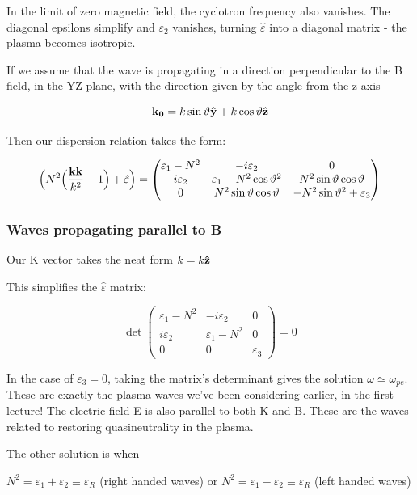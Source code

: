 \documentclass[PlasmaNotes.tex]{subfiles}
\begin{document}
In the limit of zero magnetic field, the cyclotron frequency also vanishes. The diagonal epsilons simplify and $\varepsilon_2$ vanishes, turning $\hat{\varepsilon}$ into a diagonal matrix - the plasma becomes isotropic.

If we assume that the wave is propagating in a direction perpendicular to the B field, in the YZ plane, with the direction given by the angle from the z axis

\[ \mathbf{k_0} =k \sin{\vartheta} \mathbf{\hat{y}} + k \cos{\vartheta} \mathbf{\hat{z}}  \]

Then our dispersion relation takes the form:

\[ \Big(N^2 \Big(\frac{\mathbf{k}\mathbf{k}}{k^2} -1\Big) + \hat{\varepsilon}\Big) = 
\begin{pmatrix}
\varepsilon_1-N^2 & -i\varepsilon_2 & 0 \\
i\varepsilon_2 & \varepsilon_1-N^2\cos{\vartheta}^2 & N^2\sin{\vartheta}\cos{\vartheta} \\
0 & N^2\sin{\vartheta}\cos{\vartheta} & -N^2\sin{\vartheta}^2+\varepsilon_3
\end{pmatrix} \]

\subsubsection{Waves propagating parallel to B}

Our K vector takes the neat form $k=k \mathbf{\hat{z}}$

This simplifies the $\hat{\varepsilon}$ matrix:

\[ \det{ 
\begin{pmatrix}
\varepsilon_1-N^2 & -i\varepsilon_2 & 0 \\
i\varepsilon_2 & \varepsilon_1-N^2 & 0 \\
0 & 0 & \varepsilon_3
\end{pmatrix}} = 0 \]

In the case of $\varepsilon_3 = 0$, taking the matrix's determinant gives the solution $\omega \simeq \omega_{pe}$. These are exactly the plasma waves we've been considering earlier, in the first lecture! The electric field E is also parallel to both K and B. These are the waves related to restoring quasineutrality in the plasma.

The other solution is when

$ N^2 = \varepsilon_1 + \varepsilon_2 \equiv \varepsilon_R $ (right handed waves)
or
$ N^2 = \varepsilon_1 - \varepsilon_2 \equiv \varepsilon_R $ (left handed waves)
\end{document}
